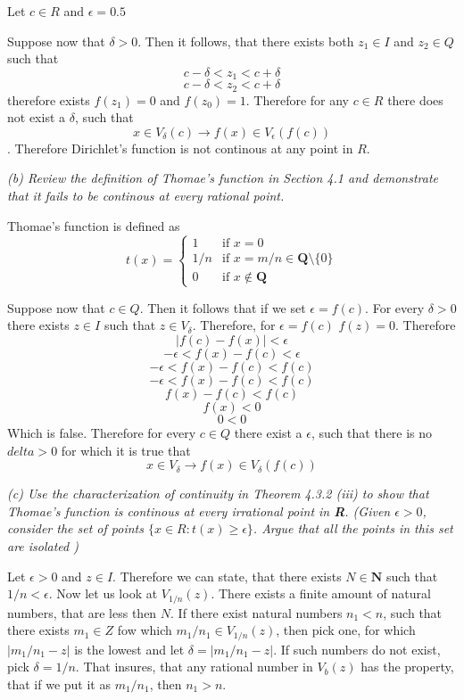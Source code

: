 \documentclass[11pt,oneside,titlepage]{book}
\begin{document}
Let $c \in R$ and $\epsilon = 0.5$

Suppose now that $\delta > 0$. Then it follows, that there exists both
$z_1 \in I$ and $z_2 \in Q$ such that
$$c - \delta < z_1 < c + \delta$$
$$c - \delta < z_2 < c + \delta$$
therefore exists $f(z_1) = 0$ and $f(z_0) = 1$.
Therefore for any $c \in R$ there does not exist a $\delta$, such that
$$x \in V_\delta(c) \to f(x) \in V_\epsilon(f(c))$$. Therefore Dirichlet's
function is not continous at any point in $R$.

\textit{(b) Review the definition of Thomae's function in Section 4.1 and
  demonstrate that it fails to be continous at every rational point.}

Thomae's function is defined as 
\begin{equation}
  t(x)=
  \begin{cases}
    1 & \text{if } x = 0\\
    1/n & \text {if } x = m/n \in \textbf{Q} \text{\textbackslash} \{0\} \\
    0 & \text{if } x \notin \textbf{Q}
  \end{cases}
\end{equation}

Suppose now that $c \in Q$. Then it follows that if we set $\epsilon = f(c)$.
For every $\delta > 0$ there exists $z \in I$ such that $z \in V_\delta$.
Therefore, for $\epsilon = f(c)$ $f(z) = 0$. Therefore
$$|f(c) - f(x)| < \epsilon$$
$$- \epsilon < f(x) - f(c) < \epsilon$$
$$- \epsilon < f(x) - f(c) < f(c)$$
$$- \epsilon < f(x) - f(c) < f(c)$$
$$f(x) - f(c) < f(c)$$
$$f(x) < 0$$
$$0  < 0$$
Which is false. Therefore for every $c \in Q$ there exist a $\epsilon$,
such that there is no $delta > 0$ for which it is true that
$$x \in V_\delta \to f(x) \in V_\delta(f(c))$$

\textit{(c) Use the characterization of continuity in Theorem 4.3.2 (iii) to
  show that Thomae's function is continous at every irrational point in
  \textbf{R}. (Given $\epsilon > 0$, consider the set of points
  $\{x \in R: t(x) \geq \epsilon\}$. Argue that all the points in this set
  are isolated )}

Let $\epsilon > 0$ and $z \in I$. Therefore we can state, that there exists
$N \in \textbf{N}$ such that $1/n < \epsilon$. Now let us look at
$V_{1/n}(z)$. 
There exists a finite amount of natural numbers, that
are less then $N$. If there exist natural numbers $n_1 < n$, such
that there exists $m_1 \in Z$ fow which $m_1 / n_1 \in V_{1/n}(z)$, then pick
one, for which $|m_1 / n_1 - z|$ is the lowest and let $\delta
= |m_1 / n_1 - z|$.
If such numbers do not exist, pick $\delta = 1/n$.
That insures, that any rational number in $V_b(z)$ has the property,
that if we put it as $m_1/n_1$, then $n_1 > n$.
\end{document}
